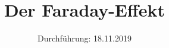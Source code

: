 
\usepackage{pgfplotstable}
\subject{V46}
\title{Der Faraday-Effekt}
\date{%
  Durchführung: 18.11.2019
}



\maketitle
\thispagestyle{empty}
\tableofcontents
\newpage



\newpage



\printbibliography{}



